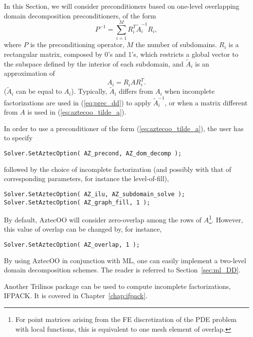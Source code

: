 In this Section, we will consider preconditioners based on one-level
overlapping domain decomposition preconditioners, of the form
\begin{equation}
  \label{eq:prec_dd}
  P^{-1} = \sum_{i=1}^M R_i^T \tilde{A}_i^{-1} R_i,
\end{equation}
where $P$ is the preconditioning operator, $M$ the number of subdomains.
$R_i$ is a rectangular matrix, composed by 0's and 1's, which restricts
a global vector to the subspace defined by the interior of each
subdomain, and $\tilde{A}_i$ is an approximation of
\begin{equation}
  \label{eq:aztecoo_tilde_a}
  A_i = R_i A R_i^T .
\end{equation}
($\tilde{A}_i$ can be equal to $A_i$). Typically, $\tilde{A}_i$ differs
from $A_i$ when incomplete factorizations are used in (\ref{eq:prec_dd})
to apply $\tilde{A}_i^{-1}$, or when a matrix different from $A$ is used
in (\ref{eq:aztecoo_tilde_a}).

In order to use a preconditioner of the form (\ref{eq:aztecoo_tilde_a}),
the user has to specify
\begin{verbatim}
Solver.SetAztecOption( AZ_precond, AZ_dom_decomp );
\end{verbatim}
followed by the choice of incomplete factorization (and possibly with
that of corresponding parameters, for instance the level-of-fill),
\begin{verbatim}
Solver.SetAztecOption( AZ_ilu, AZ_subdomain_solve );
Solver.SetAztecOption( AZ_graph_fill, 1 );
\end{verbatim}
By default, AztecOO will consider zero-overlap among the rows of
$A$\footnote{For point matrices arising from the FE discretization of
  the PDE problem with local functions, this is equivalent to one mesh
  element of overlap.}. However, this value of overlap can be changed by,
for instance,
\begin{verbatim}
Solver.SetAztecOption( AZ_overlap, 1 );
\end{verbatim}

\begin{remark} By using AztecOO in conjunction with ML, one can easily
  implement a two-level domain decomposition schemes. The reader is
  referred to Section~\ref{sec:ml_DD}.
\end{remark}

\begin{remark} Another Trilinos package can be used to compute
  incomplete factorizations, IFPACK. It is covered in
  Chapter~\ref{chap:ifpack}.
\end{remark}


